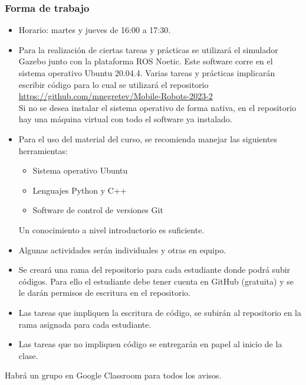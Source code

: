 \begin{frame}\frametitle{Forma de trabajo}
  \begin{itemize}
  \item Horario: martes y jueves de 16:00 a 17:30.\\
  \item Para la realización de ciertas tareas y prácticas se utilizará el simulador Gazebo junto con la plataforma ROS Noetic. Este software corre en el sistema operativo Ubuntu 20.04.4. Varias tareas y prácticas implicarán escribir código para lo cual se utilizará el repositorio\\
    \url{https://github.com/mnegretev/Mobile-Robots-2023-2}\\
    Si no se desea instalar el sistema operativo de forma nativa, en el repositorio hay una máquina virtual con todo el software ya instalado.
  \item Para el uso del material del curso, se recomienda manejar las siguientes herramientas:
    \begin{itemize}
    \item Sistema operativo Ubuntu
    \item Lenguajes Python y C++
    \item Software de control de versiones Git
    \end{itemize}
    Un conocimiento a nivel introductorio es suficiente.
  \item Algunas actividades serán individuales y otras en equipo.
  \item Se creará una rama del repositorio para cada estudiante donde podrá subir códigos. Para ello el estudiante debe tener cuenta en GitHub (gratuita) y se le darán permisos de escritura en el repositorio. 
  \item Las tareas que impliquen la escritura de código, se subirán al repositorio en la rama asignada para cada estudiante.
  \item Las tareas que no impliquen código se entregarán en papel al inicio de la clase.
  \end{itemize}
  Habrá un grupo en Google Classroom para todos los avisos. 
\end{frame}


